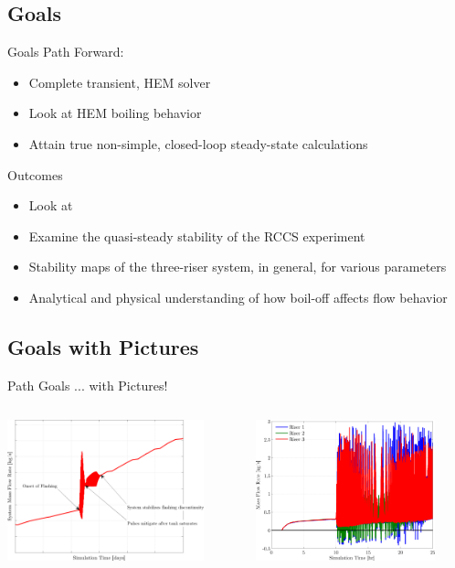 \documentclass[10pt,t,xcolor=table]{beamer}
\newenvironment{Itemize}
    {\begin{itemize}\setlength{\itemsep}{0.8em}\setlength{\leftmargin}{0.0em}\setlength{\labelwidth}{0em}}
    {\end{itemize}}
\begin{document}
    \subsection*{Goals}
    \begin{frame}{Goals}
        Path Forward:
            \begin{Itemize}
                \item{Complete transient, HEM solver}
                \item{Look at HEM boiling behavior}
                \item{Attain true non-simple, closed-loop steady-state calculations}
            \end{Itemize}
            \vfill
        Outcomes
            \begin{Itemize}
                \item{Look at }
                \item{Examine the quasi-steady stability of the RCCS experiment}
                \item{Stability maps of the three-riser system, in general, for various parameters}
                \item{Analytical and physical understanding of how boil-off affects flow behavior}
            \end{Itemize}
    \end{frame}
    
    \subsection*{Goals with Pictures}
    \begin{frame}[c]{Path Goals ... with Pictures!}
        \begin{columns}[c]
            \hspace{1em}
            \begin{column}[c]{0.6\textwidth}
                \includegraphics[height=1.60in]{PowerProfiles_MassFlowRateAnnotationsThesis}
            \end{column}
            \begin{column}[c]{0.6\textwidth}
                \includegraphics[height=1.60in]{ExperimentMassFlowRateVsTime}
            \end{column}
        \end{columns}
    \end{frame}
    
\end{document}
